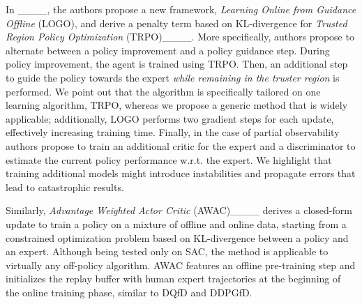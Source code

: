 In ____, the authors propose a new framework, {\em Learning Online from Guidance Offline} (LOGO), and derive a penalty term based on KL-divergence for {\em Trusted Region Policy Optimization} (TRPO)____. More specifically, authors propose to alternate between a policy improvement and a policy guidance step. During policy improvement, the agent is trained using TRPO. Then, an additional step to guide the policy towards the expert {\em while remaining in the truster region} is performed. We point out that the algorithm is specifically tailored on one learning algorithm, TRPO, whereas we propose a generic method that is widely applicable; additionally, LOGO performs two gradient steps for each update, effectively increasing training time. Finally, in the case of partial observability authors propose to train an additional critic for the expert and a discriminator to estimate the current policy performance w.r.t. the expert. We highlight that training additional models might introduce instabilities and propagate errors that lead to catastrophic results.

Similarly, {\em Advantage Weighted Actor Critic} (AWAC)____ derives a closed-form update to train a policy on a mixture of offline and online data, starting from a constrained optimization problem based on KL-divergence between a policy and an expert. Although being tested only on SAC, the method is applicable to virtually any off-policy algorithm. AWAC features an offline pre-training step and initializes the replay buffer with human expert trajectories at the beginning of the online training phase, similar to DQfD and DDPGfD.